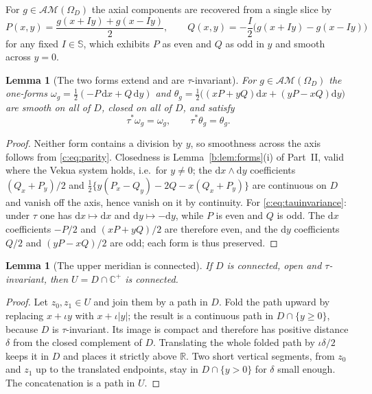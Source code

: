 \documentclass[11pt,a4paper]{article}
\numberwithin{equation}{section}
\newtheorem{lemma}[theorem]{Lemma}
\theoremstyle{definition}
\theoremstyle{remark}
\theoremstyle{plain}
\newcommand{\RR}{\mathbb R}
\newcommand{\CC}{\mathbb C}
\newcommand{\SSS}{\mathbb S}
\newcommand{\Cplus}{\CC^{+}}
\newcommand{\AM}{\mathcal{AM}}
\newcommand{\Om}{\Omega}
\newcommand{\om}{\omega}
\newcommand{\thet}{\theta}
\newcommand{\abs}[1]{\lvert #1\rvert}
\newcommand{\dd}{\mathrm d}
\begin{document}
For $g\in\AM(\Om_D)$ the axial components are recovered from a single
slice by
\begin{equation}
  P(x,y)=\frac{g(x+Iy)+g(x-Iy)}2,\qquad
  Q(x,y)=-\frac I2\bigl(g(x+Iy)-g(x-Iy)\bigr)
  \label{c:eq:parity}
\end{equation}
for any fixed $I\in\SSS$, which exhibits $P$ as even and $Q$ as odd in
$y$ and smooth across $y=0$.

\begin{lemma}[The two forms extend and are $\tau$-invariant]
\label{c:lem:invariance}
For $g\in\AM(\Om_D)$ the one-forms
$\om_g=\tfrac12(-P\,\dd x+Q\,\dd y)$ and
$\thet_g=\tfrac12\bigl((xP+yQ)\dd x+(yP-xQ)\dd y\bigr)$
are smooth on all of $D$, closed on all of $D$, and satisfy
\begin{equation}
  \tau^{*}\om_g=\om_g,\qquad \tau^{*}\thet_g=\thet_g .
  \label{c:eq:tauinvariance}
\end{equation}
\end{lemma}

\begin{proof}
Neither form contains a division by $y$, so smoothness across the axis
follows from \eqref{c:eq:parity}.  Closedness is Lemma~\ref{b:lem:forms}(i) of Part~II, valid where the Vekua system holds, i.e.\ for $y\ne0$; the
$\dd x\wedge\dd y$ coefficients $(Q_x+P_y)/2$ and
$\tfrac12\{y(P_x-Q_y)-2Q-x(Q_x+P_y)\}$ are continuous on $D$ and vanish
off the axis, hence vanish on it by continuity.  For
\eqref{c:eq:tauinvariance}: under $\tau$ one has $\dd x\mapsto\dd x$ and
$\dd y\mapsto-\dd y$, while $P$ is even and $Q$ is odd.  The $\dd x$
coefficients $-P/2$ and $(xP+yQ)/2$ are therefore even, and the $\dd y$
coefficients $Q/2$ and $(yP-xQ)/2$ are odd; each form is thus preserved.
\end{proof}

\begin{lemma}[The upper meridian is connected]
\label{c:lem:upper}
If $D$ is connected, open and $\tau$-invariant, then
$U=D\cap\Cplus$ is connected.
\end{lemma}

\begin{proof}
Let $z_0,z_1\in U$ and join them by a path in $D$.  Fold the path upward
by replacing $x+\iota y$ with $x+\iota\abs y$; the result is a continuous
path in $D\cap\{y\ge0\}$, because $D$ is $\tau$-invariant.  Its image is
compact and therefore has positive distance $\delta$ from the closed
complement of $D$.  Translating the whole folded path by
$\iota\delta/2$ keeps it in $D$ and places it strictly above $\RR$.
Two short vertical segments, from $z_0$ and $z_1$ up to the translated
endpoints, stay in $D\cap\{y>0\}$ for $\delta$ small enough.  The
concatenation is a path in $U$.
\end{proof}
\end{document}
